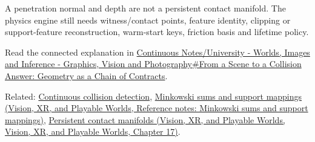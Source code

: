 A penetration normal and depth are not a persistent contact manifold. The physics engine still needs witness/contact points, feature identity, clipping or support-feature reconstruction, warm-start keys, friction basis and lifetime policy.

Read the connected explanation in \hyperref[03-visual-computing-i-ch020-from-a-scene-to-a-collision-answer-geometry-as-a-chain-of-contracts]{Continuous Notes/University - Worlds, Images and Inference - Graphics, Vision and Photography\#From a Scene to a Collision Answer: Geometry as a Chain of Contracts}.

Related: \hyperref[appendix-66956ed6c753]{Continuous collision detection}, \href{../07-Vision-XR-and-Playable-Worlds/main.pdf\#nameddest=appendix-215ac7099a82}{Minkowski sums and support mappings (Vision, XR, and Playable Worlds, Reference notes: Minkowski sums and support mappings)}, \href{../07-Vision-XR-and-Playable-Worlds/main.pdf\#nameddest=06-engine-ii-ch046-complete-persistent-contact-implementation-and-cache-policy}{Persistent contact manifolds (Vision, XR, and Playable Worlds, Vision, XR, and Playable Worlds, Chapter 17)}.
